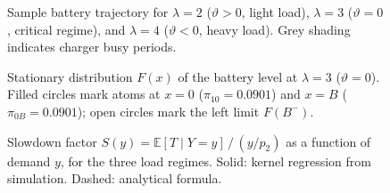 

\begin{figure}[t]
  \centering
  \begin{subfigure}[b]{\textwidth}
    \centering
  \end{subfigure}
  \begin{subfigure}[b]{\textwidth}
    \centering
  \end{subfigure}
  \begin{subfigure}[b]{\textwidth}
    \centering
  \end{subfigure}
  \caption{Sample battery trajectory for $\lambda=2$ ($\vartheta>0$, light load),
    $\lambda=3$ ($\vartheta=0$, critical regime), and $\lambda=4$ ($\vartheta<0$, heavy load).
    Grey shading indicates charger busy periods.}
  \label{fig:trajectory}
\end{figure}


\begin{figure}[t]
  \centering
  \caption{Stationary distribution $F(x)$ of the battery level at $\lambda=3$
    ($\vartheta=0$). Filled circles mark atoms at $x=0$
    ($\pi_{10}=0.0901$) and $x=B$ ($\pi_{0B}=0.0901$);
    open circles mark the left limit $F(B^-)$.}
  \label{fig:cdf}
\end{figure}


\begin{figure}[t]
  \centering

  \caption{Slowdown factor $S(y) = \mathbb{E}[T \mid Y=y]\,/\,(y/p_2)$ as a
    function of demand $y$, for the three load regimes.
    Solid: kernel regression from simulation. Dashed: analytical formula.}
  \label{fig:slowdown}
\end{figure}